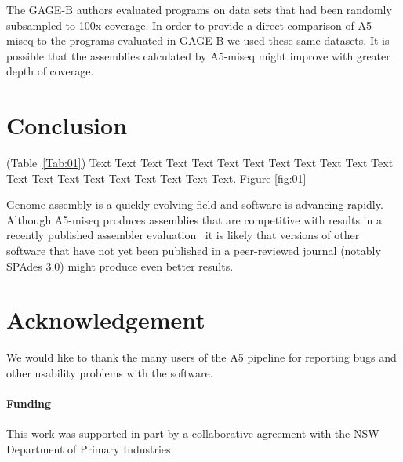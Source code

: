 \documentclass{bioinfo}
\begin{document}
The GAGE-B authors evaluated programs on data sets that had been randomly subsampled to 100x coverage.
In order to provide a direct comparison of A5-miseq to the programs evaluated in GAGE-B we used these same datasets.
It is possible that the assemblies calculated by A5-miseq might improve with greater depth of coverage.

\section{Conclusion}

(Table~\ref{Tab:01}) Text Text Text Text Text Text  Text Text Text Text Text Text Text Text Text  Text Text Text Text Text Text. Figure \ref{fig:01} 

Genome assembly is a quickly evolving field and software is advancing rapidly. 
Although A5-miseq produces assemblies that are competitive with results in a recently published assembler evaluation~\citep{Magoc13} it is likely that versions of other software that have not yet been published in a peer-reviewed journal (notably SPAdes 3.0) might produce even better results.


\section*{Acknowledgement}
We would like to thank the many users of the A5 pipeline for reporting bugs and other usability problems with the software.

\paragraph{Funding\textcolon} This work was supported in part by a collaborative agreement with the NSW Department of Primary Industries.

%
%
%
%
%
%
%
%
%
\end{document}
